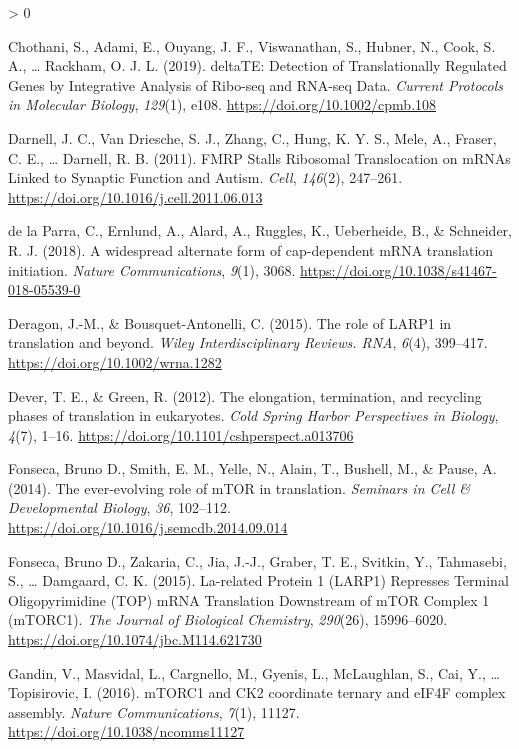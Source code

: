 \documentclass[
  12pt,
  openany]{book}
\newlength{\cslhangindent}
\newenvironment{CSLReferences}[2] %
 {%
  \setlength{\parindent}{0pt}
  \ifodd #1 \everypar{\setlength{\hangindent}{\cslhangindent}}\ignorespaces\fi
  \ifnum #2 > 0
  \setlength{\parskip}{#2\baselineskip}
  \fi
 }%
 {}
\begin{document}
\begin{CSLReferences}{1}{0}
\leavevmode\hypertarget{ref-Chothani2019}{}%
Chothani, S., Adami, E., Ouyang, J. F., Viswanathan, S., Hubner, N., Cook, S. A., \ldots{} Rackham, O. J. L. (2019). {deltaTE}: {Detection} of {Translationally Regulated Genes} by {Integrative Analysis} of {Ribo}-seq and {RNA}-seq {Data}. \emph{Current Protocols in Molecular Biology}, \emph{129}(1), e108. \url{https://doi.org/10.1002/cpmb.108}

\leavevmode\hypertarget{ref-Darnell2011}{}%
Darnell, J. C., Van Driesche, S. J., Zhang, C., Hung, K. Y. S., Mele, A., Fraser, C. E., \ldots{} Darnell, R. B. (2011). {FMRP Stalls Ribosomal Translocation} on {mRNAs Linked} to {Synaptic Function} and {Autism}. \emph{Cell}, \emph{146}(2), 247--261. \url{https://doi.org/10.1016/j.cell.2011.06.013}

\leavevmode\hypertarget{ref-delaParra2018}{}%
de la Parra, C., Ernlund, A., Alard, A., Ruggles, K., Ueberheide, B., \& Schneider, R. J. (2018). A widespread alternate form of cap-dependent {mRNA} translation initiation. \emph{Nature Communications}, \emph{9}(1), 3068. \url{https://doi.org/10.1038/s41467-018-05539-0}

\leavevmode\hypertarget{ref-Deragon2015}{}%
Deragon, J.-M., \& Bousquet-Antonelli, C. (2015). The role of {LARP1} in translation and beyond. \emph{Wiley Interdisciplinary Reviews. RNA}, \emph{6}(4), 399--417. \url{https://doi.org/10.1002/wrna.1282}

\leavevmode\hypertarget{ref-Dever2012}{}%
Dever, T. E., \& Green, R. (2012). The elongation, termination, and recycling phases of translation in eukaryotes. \emph{Cold Spring Harbor Perspectives in Biology}, \emph{4}(7), 1--16. \url{https://doi.org/10.1101/cshperspect.a013706}

\leavevmode\hypertarget{ref-Fonseca2014}{}%
Fonseca, Bruno D., Smith, E. M., Yelle, N., Alain, T., Bushell, M., \& Pause, A. (2014). The ever-evolving role of {mTOR} in translation. \emph{Seminars in Cell \& Developmental Biology}, \emph{36}, 102--112. \url{https://doi.org/10.1016/j.semcdb.2014.09.014}

\leavevmode\hypertarget{ref-Fonseca2015}{}%
Fonseca, Bruno D., Zakaria, C., Jia, J.-J., Graber, T. E., Svitkin, Y., Tahmasebi, S., \ldots{} Damgaard, C. K. (2015). La-related {Protein} 1 ({LARP1}) {Represses Terminal Oligopyrimidine} ({TOP}) {mRNA Translation Downstream} of {mTOR Complex} 1 ({mTORC1}). \emph{The Journal of Biological Chemistry}, \emph{290}(26), 15996--6020. \url{https://doi.org/10.1074/jbc.M114.621730}

\leavevmode\hypertarget{ref-Gandin2016}{}%
Gandin, V., Masvidal, L., Cargnello, M., Gyenis, L., McLaughlan, S., Cai, Y., \ldots{} Topisirovic, I. (2016). {mTORC1} and {CK2} coordinate ternary and {eIF4F} complex assembly. \emph{Nature Communications}, \emph{7}(1), 11127. \url{https://doi.org/10.1038/ncomms11127}


\end{CSLReferences}
\end{document}
